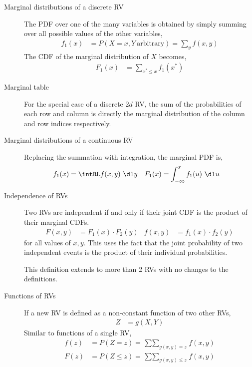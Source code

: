 \begin{description}
    \item[Marginal distributions of a discrete RV] The PDF over one of the many variables
          is obtained by simply summing over all possible values of the other variables,
          \begin{align}
              f_1(x) & = P(X = x, Y\ \text{arbitrary}) = \sum_{y} f(x, y)
          \end{align}
          The CDF of the marginal distribution of $ X $ becomes,
          \begin{align}
              F_1(x) & = \sum_{x^* \leq x} f_1(x^*)
          \end{align}

    \item[Marginal table] For the special case of a discrete $ 2d $ RV, the sum of
          the probabilities of each row and column is directly the marginal distribution
          of the column and row indices respectively.

    \item[Marginal distributions of a continuous RV] Replacing the summation with
          integration, the marginal PDF is,
          \begin{align}
              f_1(x) & =  \intRL f(x, y)\ \dl y           &
              F_1(x) & = \int_{-\infty}^{x} f_1(u)\ \dl u
          \end{align}

    \item[Independence of RVs] Two RVs are independent if and only if their joint
          CDF is the product of their marginal CDFs.
          \begin{align}
              F(x, y) & = F_1(x) \cdot F_2(y) & f(x, y) & = f_1(x) \cdot f_2(y)
          \end{align}
          for all values of $ x,y $. This uses the fact that the joint probability of
          two independent events is the product of their individual probabilities. \par
          This definition extends to more than 2 RVs with no changes to the definitions.

    \item[Functions of RVs] If a new RV is defined as a non-constant function of two
          other RVs,
          \begin{align}
              Z & = g(X, Y)
          \end{align}
          Similar to functions of a single RV,
          \begin{align}
              f(z) & = P(Z = z) = \mathop{\sum \sum}_{g(x,y) = z} f(x, y)       \\
              F(z) & = P(Z \leq z) = \mathop{\sum \sum}_{g(x,y) \leq z} f(x, y)
          \end{align}


\end{description}

